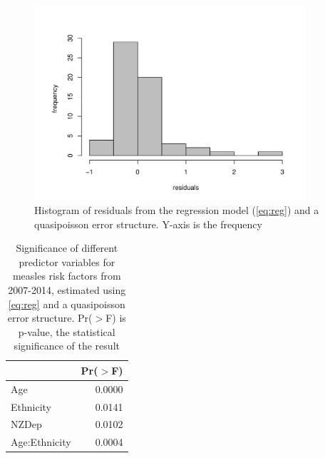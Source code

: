 \documentclass{article}
\begin{document}
\begin{figure}
\begin{center}
     \includegraphics[width=0.9\textwidth]{Cases_regmodel_resid.pdf}
\end{center}
\caption{Histogram of residuals from the regression model (\autoref{eq:reg}) and a quasipoisson error structure. Y-axis is the frequency}
\label{fig:resid}
\end{figure}

\vspace{5mm} %
\begin{table}
\begin{center}
\begin{tabular}{lr}
  \hline
 & Pr($>$F) \\ 
  \hline
Age & 0.0000 \\ 
  Ethnicity & 0.0141 \\ 
  NZDep & 0.0102 \\ 
  Age:Ethnicity & 0.0004 \\ 
   \hline
\end{tabular}\caption{Significance of different predictor variables for measles risk factors from 2007-2014, estimated using \autoref{eq:reg} and a quasipoisson error structure. Pr($>$F) is p-value, the statistical significance of the result}
\label{table:anova}
\end{center}
\end{table}
\end{document}
